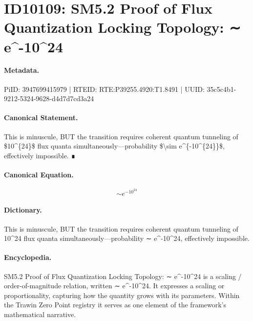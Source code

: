 \section*{ID10109: SM5.2 Proof of Flux Quantization Locking Topology: ∼ e\textasciicircum{}-10\textasciicircum{}24}
\paragraph{Metadata.}
PiID: 3947699415979 | RTEID: RTE:P39255.4920:T1.8491 | UUID: 35c5c4b1-9212-5324-9628-d4d7d7cd3a24

\paragraph{Canonical Statement.}
This is minuscule, BUT the transition requires coherent quantum tunneling of \$10\textasciicircum{}\{24\}\$ flux quanta simultaneously—probability \$\textbackslash{}sim e\textasciicircum{}\{-10\textasciicircum{}\{24\}\}\$, effectively impossible. ∎

\paragraph{Canonical Equation.}
\[
\sim e^{-10^{24}}
\]

\paragraph{Dictionary.}
This is minuscule, BUT the transition requires coherent quantum tunneling of 10\textasciicircum{}24 flux quanta simultaneously—probability ∼ e\textasciicircum{}-10\textasciicircum{}24, effectively impossible.

\paragraph{Encyclopedia.}
SM5.2 Proof of Flux Quantization Locking Topology: ∼ e\textasciicircum{}-10\textasciicircum{}24 is a scaling / order-of-magnitude relation, written ∼ e\textasciicircum{}-10\textasciicircum{}24. It expresses a scaling or proportionality, capturing how the quantity grows with its parameters. Within the Trawin Zero Point registry it serves as one element of the framework's mathematical narrative.
